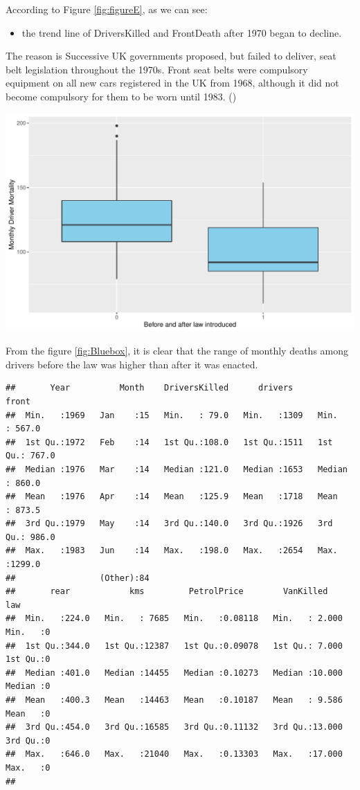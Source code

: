\documentclass[11pt,a4paper,]{article}
\providecommand{\tightlist}{%
  \setlength{\itemsep}{0pt}\setlength{\parskip}{0pt}}
\begin{document}
According to Figure \ref{fig:figureE}, as we can see:

\begin{itemize}
\tightlist
\item
  the trend line of DriversKilled and FrontDeath after 1970 began to decline.
\end{itemize}

The reason is Successive UK governments proposed, but failed to deliver, seat belt legislation throughout the 1970s. Front seat belts were compulsory equipment on all new cars registered in the UK from 1968, although it did not become compulsory for them to be worn until 1983. (\cite{richens2000condoms}) \clearpage

\includegraphics{report_files/figure-latex/Bluebox-1.pdf}

From the figure \ref{fig:Bluebox}, it is clear that the range of monthly deaths among drivers before the law was higher than after it was enacted.

\begin{verbatim}
##       Year          Month    DriversKilled      drivers         front       
##  Min.   :1969   Jan    :15   Min.   : 79.0   Min.   :1309   Min.   : 567.0  
##  1st Qu.:1972   Feb    :14   1st Qu.:108.0   1st Qu.:1511   1st Qu.: 767.0  
##  Median :1976   Mar    :14   Median :121.0   Median :1653   Median : 860.0  
##  Mean   :1976   Apr    :14   Mean   :125.9   Mean   :1718   Mean   : 873.5  
##  3rd Qu.:1979   May    :14   3rd Qu.:140.0   3rd Qu.:1926   3rd Qu.: 986.0  
##  Max.   :1983   Jun    :14   Max.   :198.0   Max.   :2654   Max.   :1299.0  
##                 (Other):84                                                  
##       rear            kms         PetrolPrice        VanKilled           law   
##  Min.   :224.0   Min.   : 7685   Min.   :0.08118   Min.   : 2.000   Min.   :0  
##  1st Qu.:344.0   1st Qu.:12387   1st Qu.:0.09078   1st Qu.: 7.000   1st Qu.:0  
##  Median :401.0   Median :14455   Median :0.10273   Median :10.000   Median :0  
##  Mean   :400.3   Mean   :14463   Mean   :0.10187   Mean   : 9.586   Mean   :0  
##  3rd Qu.:454.0   3rd Qu.:16585   3rd Qu.:0.11132   3rd Qu.:13.000   3rd Qu.:0  
##  Max.   :646.0   Max.   :21040   Max.   :0.13303   Max.   :17.000   Max.   :0  
## 
\end{verbatim}
\end{document}
